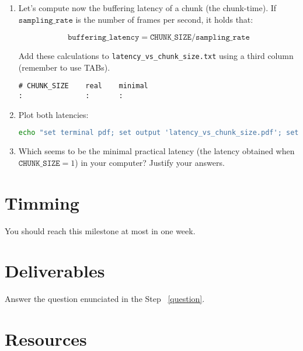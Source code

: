 \begin{enumerate}
\item Let's compute now the buffering latency of a chunk (the chunk-time). If
  $\mathtt{sampling\_rate}$ is the number of frames per second, it holds
  that:
  
  \begin{equation}
    \mathtt{buffering\_latency} = \mathtt{CHUNK\_SIZE} / \mathtt{sampling\_rate}
  \end{equation}

  Add these calculations to \texttt{latency\_vs\_chunk\_size.txt} using
  a third column (remember to use TABs).
\begin{verbatim}
# CHUNK_SIZE    real    minimal
:               :       :
\end{verbatim}

\item Plot both latencies:

  \begin{lstlisting}[language=Bash]
    echo "set terminal pdf; set output 'latency_vs_chunk_size.pdf'; set xlabel 'CHUNK\_SIZE (frames)'; set ylabel 'Latency (seconds)'; set key left; plot 'latency_vs_chunk_size.txt' using 1:2 title 'Real' with linespoints, 'latency_vs_chunk_size.txt' using 1:3 title 'Minimal' with linespoints" | gnuplot
  \end{lstlisting}
  
\item Which seems to be the minimal practical latency (the latency obtained
  when $\mathtt{CHUNK\_SIZE}=1$) in your computer? Justify your
  answers. \label{question}

\end{enumerate}

\section{Timming}

You should reach this milestone at most in one week.

\section{Deliverables}

Answer the question enunciated in the Step ~\ref{question}.

\section{Resources}


